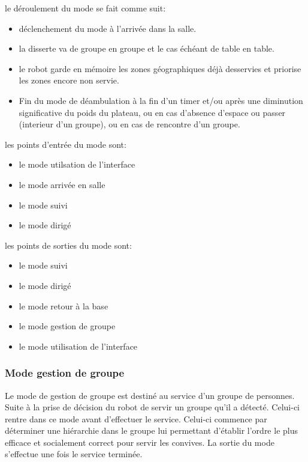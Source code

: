 le déroulement du mode se fait comme suit:
\begin{itemize}
\item déclenchement du mode à l'arrivée dans la salle.
\item la disserte va de groupe en groupe et le cas échéant de table en
  table.
\item le robot garde en mémoire les zones géographiques déjà
  desservies et priorise les zones encore non servie.
\item Fin du mode de déambulation à la fin d'un timer et/ou après une
  diminution significative du poids du plateau, ou en cas d'absence
  d'espace ou passer (interieur d'un groupe), ou en cas de rencontre
  d'un groupe.\\
\end{itemize}

les points d'entrée du mode sont:
\begin{itemize}
\item le mode utilsation de l'interface
\item le mode arrivée en salle
\item le mode suivi
\item le mode dirigé\\
\end{itemize}

les points de sorties du mode sont:
\begin{itemize}
\item le mode suivi
\item le mode dirigé
\item le mode retour à la base
\item le mode gestion de groupe
\item le mode utilisation de l'interface\\
\end{itemize}

\subsubsection{Mode gestion de groupe}
Le mode de gestion de groupe est destiné au service d'un groupe de personnes. Suite à la prise de décision du robot de servir un groupe qu'il a détecté. Celui-ci rentre dans ce mode avant d'effectuer le service. Celui-ci commence par déterminer une hiérarchie dans le groupe lui permettant d'établir l'ordre le plus efficace et socialement correct pour servir les convives. La sortie du mode s'effectue une fois le service terminée.\\

